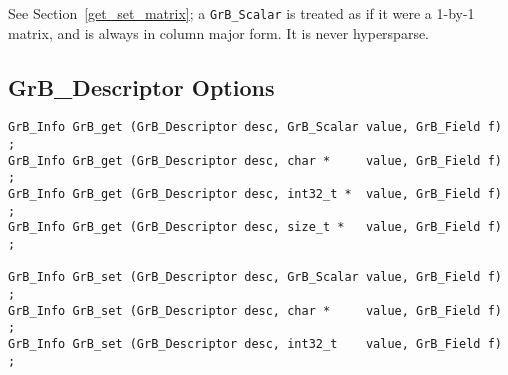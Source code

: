 See Section~\ref{get_set_matrix}; a \verb'GrB_Scalar' is treated as if it were
a 1-by-1 matrix, and is always in column major form.  It is never hypersparse.

\newpage
\subsection{{\sf GrB\_Descriptor} Options}
\label{get_set_descriptor}

\begin{mdframed}[userdefinedwidth=6in]
{\footnotesize
\begin{verbatim}
GrB_Info GrB_get (GrB_Descriptor desc, GrB_Scalar value, GrB_Field f) ;
GrB_Info GrB_get (GrB_Descriptor desc, char *     value, GrB_Field f) ;
GrB_Info GrB_get (GrB_Descriptor desc, int32_t *  value, GrB_Field f) ;
GrB_Info GrB_get (GrB_Descriptor desc, size_t *   value, GrB_Field f) ;

GrB_Info GrB_set (GrB_Descriptor desc, GrB_Scalar value, GrB_Field f) ;
GrB_Info GrB_set (GrB_Descriptor desc, char *     value, GrB_Field f) ;
GrB_Info GrB_set (GrB_Descriptor desc, int32_t    value, GrB_Field f) ;
\end{verbatim}
}\end{mdframed}

